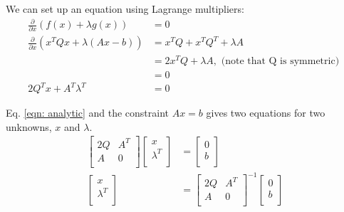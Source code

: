 \documentclass[11pt]{article}
\begin{document}
We can set up an equation using Lagrange multipliers:
\begin{align}
\nonumber \frac{\partial}{\partial x} ( f(x) + \lambda g(x) ) &= 0 \\
\nonumber \frac{\partial}{\partial x} ( x^T Q x + \lambda (Ax-b) ) &= x^T Q + x^T Q^T + \lambda A \\
\nonumber &= 2 x^T Q + \lambda A, \text{ (note that Q is symmetric) } \\
\nonumber &= 0 \\
\label{eqn: analytic} 2Q^T x + A^T \lambda^T &= 0 
\end{align}

Eq. \ref{eqn: analytic} and the constraint $Ax=b$ gives two equations for two unknowns, $x$ and $\lambda$. 
\begin{align*}
\begin{bmatrix}
2Q & A^T \\
A & 0 \\
\end{bmatrix} 
\begin{bmatrix}
x \\
\lambda^T \\
\end{bmatrix} &=
\begin{bmatrix}
0 \\
b \\
\end{bmatrix} \\
\begin{bmatrix}
x \\
\lambda^T \\
\end{bmatrix} &= 
\begin{bmatrix}
2Q & A^T \\
A & 0 \\
\end{bmatrix} ^{-1} 
\begin{bmatrix}
0 \\
b \\
\end{bmatrix}
\end{align*}





%
%
\end{document}
